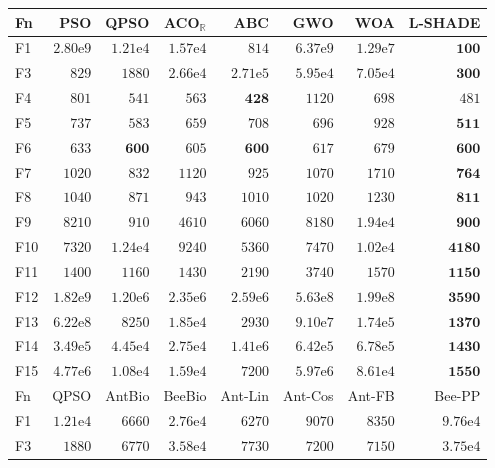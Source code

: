 \begin{tabular}{lrrrrrrr}
\toprule
Fn & PSO & QPSO & ACO$_\mathbb{R}$ & ABC & GWO & WOA & L-SHADE \\
\midrule
F1 & $2.80\mathrm{e}{9}$ & $1.21\mathrm{e}{4}$ & $1.57\mathrm{e}{4}$ & $814$ & $6.37\mathrm{e}{9}$ & $1.29\mathrm{e}{7}$ & $\mathbf{100}$ \\
F3 & $829$ & $1880$ & $2.66\mathrm{e}{4}$ & $2.71\mathrm{e}{5}$ & $5.95\mathrm{e}{4}$ & $7.05\mathrm{e}{4}$ & $\mathbf{300}$ \\
F4 & $801$ & $541$ & $563$ & $\mathbf{428}$ & $1120$ & $698$ & $481$ \\
F5 & $737$ & $583$ & $659$ & $708$ & $696$ & $928$ & $\mathbf{511}$ \\
F6 & $633$ & $\mathbf{600}$ & $605$ & $\mathbf{600}$ & $617$ & $679$ & $\mathbf{600}$ \\
F7 & $1020$ & $832$ & $1120$ & $925$ & $1070$ & $1710$ & $\mathbf{764}$ \\
F8 & $1040$ & $871$ & $943$ & $1010$ & $1020$ & $1230$ & $\mathbf{811}$ \\
F9 & $8210$ & $910$ & $4610$ & $6060$ & $8180$ & $1.94\mathrm{e}{4}$ & $\mathbf{900}$ \\
F10 & $7320$ & $1.24\mathrm{e}{4}$ & $9240$ & $5360$ & $7470$ & $1.02\mathrm{e}{4}$ & $\mathbf{4180}$ \\
F11 & $1400$ & $1160$ & $1430$ & $2190$ & $3740$ & $1570$ & $\mathbf{1150}$ \\
F12 & $1.82\mathrm{e}{9}$ & $1.20\mathrm{e}{6}$ & $2.35\mathrm{e}{6}$ & $2.59\mathrm{e}{6}$ & $5.63\mathrm{e}{8}$ & $1.99\mathrm{e}{8}$ & $\mathbf{3590}$ \\
F13 & $6.22\mathrm{e}{8}$ & $8250$ & $1.85\mathrm{e}{4}$ & $2930$ & $9.10\mathrm{e}{7}$ & $1.74\mathrm{e}{5}$ & $\mathbf{1370}$ \\
F14 & $3.49\mathrm{e}{5}$ & $4.45\mathrm{e}{4}$ & $2.75\mathrm{e}{4}$ & $1.41\mathrm{e}{6}$ & $6.42\mathrm{e}{5}$ & $6.78\mathrm{e}{5}$ & $\mathbf{1430}$ \\
F15 & $4.77\mathrm{e}{6}$ & $1.08\mathrm{e}{4}$ & $1.59\mathrm{e}{4}$ & $7200$ & $5.97\mathrm{e}{6}$ & $8.61\mathrm{e}{4}$ & $\mathbf{1550}$ \\
\midrule
Fn & QPSO & AntBio & BeeBio & Ant-Lin & Ant-Cos & Ant-FB & Bee-PP \\
\midrule
F1 & $1.21\mathrm{e}{4}$ & $6660$ & $2.76\mathrm{e}{4}$ & $6270$ & $9070$ & $8350$ & $9.76\mathrm{e}{4}$ \\
F3 & $1880$ & $6770$ & $3.58\mathrm{e}{4}$ & $7730$ & $7200$ & $7150$ & $3.75\mathrm{e}{4}$ \\

\end{tabular}
